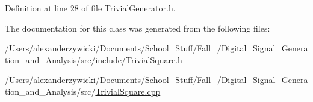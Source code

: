 Definition at line 28 of file Trivial\+Generator.\+h.



The documentation for this class was generated from the following files\+:\begin{DoxyCompactItemize}
\item 
/\+Users/alexanderzywicki/\+Documents/\+School\+\_\+\+Stuff/\+Fall\+\_/\+Digital\+\_\+\+Signal\+\_\+\+Generation\+\_\+and\+\_\+\+Analysis/src/include/\hyperlink{TrivialSquare_8h}{Trivial\+Square.\+h}\item 
/\+Users/alexanderzywicki/\+Documents/\+School\+\_\+\+Stuff/\+Fall\+\_/\+Digital\+\_\+\+Signal\+\_\+\+Generation\+\_\+and\+\_\+\+Analysis/src/\hyperlink{TrivialSquare_8cpp}{Trivial\+Square.\+cpp}\end{DoxyCompactItemize}
